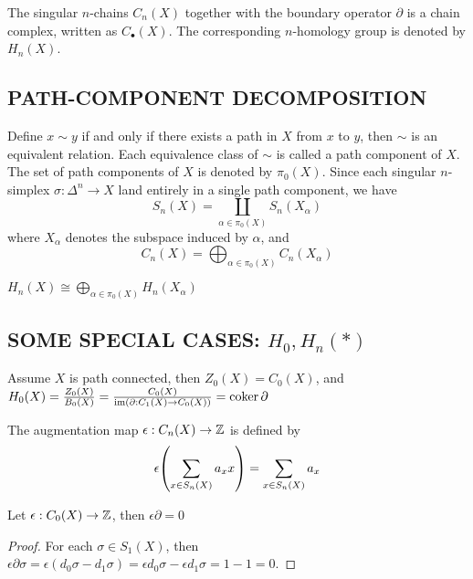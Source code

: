 \documentclass{report}
\begin{document}
\begin{proposition}
The singular $n$-chains $C_n(X)$ together with the boundary operator $\partial$ is a chain complex, written as $C_\bullet(X)$. The corresponding $n$-homology group is denoted by $H_n(X)$.
\end{proposition}

\subsection{PATH-COMPONENT DECOMPOSITION}

Define $x \sim y$ if and only if there exists a path in $X$ from $x$ to $y$, then $\sim$ is an equivalent relation. Each equivalence class of $\sim$ is called a path component of $X$. The set of path components of $X$ is denoted by $\pi_0(X)$. Since each singular $n$-simplex $\sigma: \Delta^n \to X$ land entirely in a single path component, we have
$$
    S_n(X) = \coprod_{\alpha \in \pi_0(X)} S_n(X_\alpha)
$$
where $X_\alpha$ denotes the subspace induced by $\alpha$, and
$$
    C_n(X) = \bigoplus_{\alpha \in \pi_0(X)} C_n(X_\alpha)
$$

\begin{proposition}
    $H_n(X) \cong \bigoplus_{\alpha \in \pi_0(X)} H_n(X_\alpha)$
\end{proposition}

\subsection{SOME SPECIAL CASES: $H_0, H_n(*)$}

Assume $X$ is path connected, then $Z_0(X) = C_0(X)$, and $H_0(X) = \frac{Z_0(X)}{B_0(X)} = \frac{C_0(X)}{\operatorname{im} (\partial: C_1(X) \to C_0(X))} = \operatorname{coker} \partial$

\begin{definition}
    The augmentation map $\epsilon: C_n(X) \to \mathbb{Z}$ is defined by
    $$
        \epsilon \tuple*{\sum_{x \in S_n(X)} a_x x} = \sum_{x \in S_n(X)} a_x
    $$
\end{definition}

\begin{lemma}
    Let $\epsilon: C_0(X) \to \mathbb{Z}$, then $\epsilon \partial = 0$
\end{lemma}

\begin{proof}
    For each $\sigma \in S_1(X)$, then $\epsilon \partial \sigma = \epsilon (d_0 \sigma - d_1 \sigma) = \epsilon d_0 \sigma - \epsilon d_1 \sigma = 1 - 1 = 0$.
\end{proof}
\end{document}
